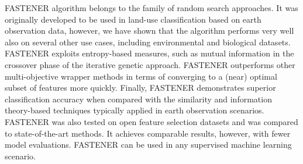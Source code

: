 FASTENER algorithm belongs to the family of random search approaches.
It was originally developed to be used in land-use classification based on earth observation data, however, we have shown that the algorithm performs very well also on several other use cases, including environmental and biological datasets.
FASTENER exploits entropy-based measures, such as mutual information in the crossover phase of the iterative genetic approach. 
FASTENER outperforms other multi-objective wrapper methods  in terms of converging to a (near) optimal subset of features more quickly. 
Finally, FASTENER demonstrates superior classification accuracy when compared with the similarity and information theory-based techniques typically applied in earth observation scenarios.
FASTENER was also tested on open feature selection datasets and was compared to state-of-the-art methods. 
It achieves comparable results, however, with fewer model evaluations.
FASTENER can be used in any supervised machine learning scenario.


